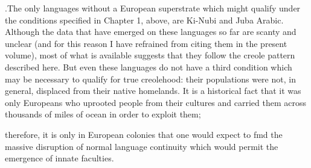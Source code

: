 \begin{itemize}
\begin{itemize}
\begin{itemize}
\begin{itemize}
.The only languages without a European superstrate which might qualify under the conditions specified in Chapter 1, above, are Ki-Nubi and Juba Arabic. Although the data that have emerged on these lan\-guages so far are scanty and unclear (and for this reason I have refrained from citing them in the present volume), most of what is available suggests that they follow the creole pattern described here. But even these languages do not have a third condition which may be necessary to qualify for true creolehood: their populations were not, in general, displaced from their native homelands. It is a historical fact that it was only Europeans who uprooted people from their cultures and carried them across thousands of miles of ocean in order to exploit them;


therefore, it is only in European colonies that one would expect to fmd the massive disruption of normal language continuity which would permit the emergence of innate faculties.


\end{itemize}
\end{itemize}
\end{itemize}
\end{itemize}
